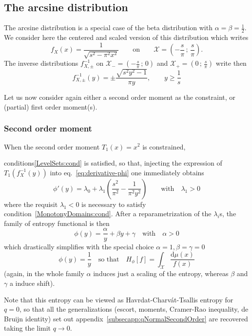 \documentclass[entropy,article,submit,moreauthors,pdftex]{Definitions/mdpi}
\newcommand{\SZ}[1]{{\color{blue} #1}}                                       %
\def\dmu{\mathrm{d}\mu}%
\def\X{\mathcal{X}}%
\begin{document}

\subsection{The arcsine distribution}
\label{subsecapp:Arcsine}

The arcsine distribution is a special case of the beta distribution with $\alpha
= \beta  = \frac12$. We  consider here the centered  and scaled version  of this
distribution which writes\SZ{
%
\[
f_X(x) = \frac{1}{\sqrt{  s^2 - \pi^2 x^2}} \qquad  \mbox{on} \qquad \X =
\left( - \frac{s}{\pi} \, ; \, \frac{s}{\pi} \right).
\]
%
The inverse distributions $f_{X,\pm}^{-1}$ on $\X_-  = \left( - \frac{s}{\pi} \,
; \, 0 \right)$ and $\X_+ = \left( 0 \, ; \, \frac{s}{\pi} \right)$ write then
%
\[
f_{X,\pm}^{-1}(y) = \pm \frac{\sqrt{s^2  y^2 - 1}}{\pi y}, \qquad y
\ge \frac{1}{s}
\]
}


Let us  now consider again  either a second order  moment as the  constraint, or
(partial) first order moment(s).



\subsubsection{Second order moment}
\label{subsubsecapp:ArcsineSecondOrder}

When   the    second   order   moment    $T_1(x)   =   x^2$    is   constrained,
\SZ{conditions\ref{LevelSets:cond}   is  satisfied,   so  that,   injecting  the
  expression       of      $T_1\left(       f_X^{-1}(y)      \right)$       into
  eq.~\eqref{eq:derivative-phi} one immediately obtains
%
\[
\phi'(y)=\lambda_0  + \lambda_1  \left( \frac{s^2}{\pi^2}  - \frac{1}{\pi^2  y^2}\right)
\qquad \mbox{with} \quad \lambda_1 > 0
\]
%
where    the   requisit    $\lambda_1   <0$    is   necessary    to   satisfy
  condition~\ref{MonotonyDomains:cond}.   After  a   reparametrization  of   the
  $\lambda_i$s, the family of entropy functional is then
%
\[
\phi(y)  = \frac{\alpha}{y} + \beta y + \gamma \quad \mbox{with}
  \quad \alpha > 0
\]
%
which drastically simplifies with the special choice $\alpha = 1, \beta = \gamma
= 0$
%
\[
\phi(y)  =   \frac{1}{y}  \quad  \mbox{so   that}  \quad  H_\phi[f]   =  \int_\X
\frac{\dmu(x)}{f(x)}
\]
%
(again, in  the whole  family $\alpha$  induces just a  scaling of  the entropy,
whereas $\beta$ and $\gamma$ a induce shift).

Note that this entropy can be viewed as Havrdat-Charv\'at-Tsallis entropy for $q
= 0$, so  that all the generalizations (escort,  moments, Cramer-Rao inequality,
de  Bruijn  identity)  set out  appendix~\ref{subsecapp:qNormalSecondOrder}  are
recovered taking the limit $q \to 0$.}
\end{document}

